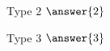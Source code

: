 \documentclass{ximera}
\begin{document}
\begin{exercise}
  Type $2$ $\answer{2}$
  \begin{hint}
    Type $3$ $\answer{3}$
  \end{hint}
\end{exercise}
\end{document}
